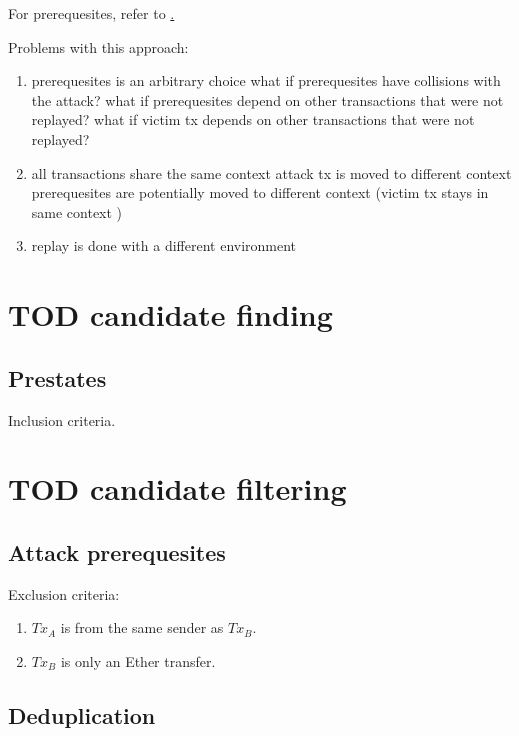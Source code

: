 \documentclass[draft,final]{vutinfth} %
\begin{document}
For prerequesites, refer to \href{https://github.com/Troublor/erebus-redgiant/blob/4544163f0c6a369b35c3237851f482d240fa7bbd/dataset/tx_history_test.go#L42-L53}.

Problems with this approach:

\begin{enumerate}
    \item prerequesites is an arbitrary choice
    \subitem what if prerequesites have collisions with the attack?
    \subitem what if prerequesites depend on other transactions that were not replayed?
    \subitem what if victim tx depends on other transactions that were not replayed?
    \item all transactions share the same context
    \subitem attack tx is moved to different context
    \subitem prerequesites are potentially moved to different context
    \subitem (victim tx stays in same context \checkmark)
    \item replay is done with a different environment
\end{enumerate}


\section{TOD candidate finding}

\subsection{Prestates}

Inclusion criteria.

\section{TOD candidate filtering}

\subsection{Attack prerequesites}

Exclusion criteria:

\begin{enumerate}
    \item $Tx_A$ is from the same sender as $Tx_B$.
    \item $Tx_B$ is only an Ether transfer.
\end{enumerate}

\subsection{Deduplication}
\end{document}
